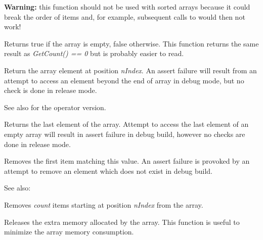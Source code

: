 {\bf Warning:} this function should not be used with sorted arrays because it
could break the order of items and, for example, subsequent calls to 
 would then not work!

\label{wxarraystringisempty}


Returns true if the array is empty, false otherwise. This function returns the
same result as {\it GetCount() == 0} but is probably easier to read.

\label{wxarraystringitem}


Return the array element at position {\it nIndex}. An assert failure will
result from an attempt to access an element beyond the end of array in debug
mode, but no check is done in release mode.

See also  for the operator
version.

\label{wxarraystringlast}


Returns the last element of the array. Attempt to access the last element of
an empty array will result in assert failure in debug build, however no checks
are done in release mode.

\label{wxarraystringremove}


Removes the first item matching this value. An assert failure is provoked by
an attempt to remove an element which does not exist in debug build.

See also: 

\label{wxarraystringremoveat}


Removes {\it count} items starting at position {\it nIndex} from the array.

\label{wxarraystringshrink}


Releases the extra memory allocated by the array. This function is useful to
minimize the array memory consumption.

